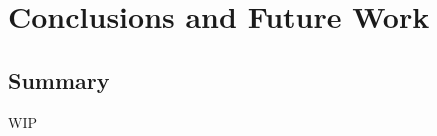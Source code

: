 \chapter{Conclusions and Future Work}
\label{chap:conclusion}
\chaptoc{}


\newpage
\section{Summary}
\label{sec:summary}
\begin{colsection}


\begin{colsection}

WIP

\end{colsection}


\end{colsection}


\newpage
